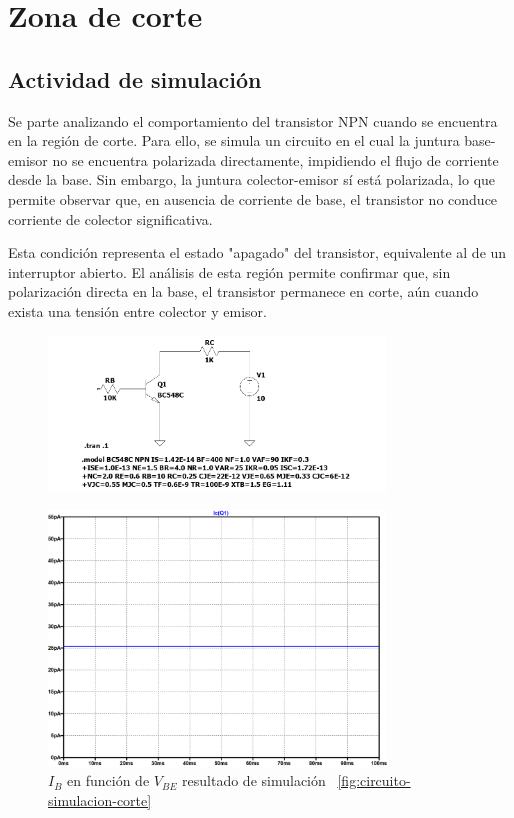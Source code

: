 \documentclass[chaptersright]{informeutn}
\begin{document}
\section{Zona de corte}
  \subsection{Actividad de simulación}
    Se parte analizando el comportamiento del transistor NPN cuando 
    se encuentra en la región de corte. Para ello, se simula un 
    circuito en el cual la juntura base-emisor no se encuentra 
    polarizada directamente, impidiendo el flujo de corriente desde 
    la base. Sin embargo, la juntura colector-emisor sí está 
    polarizada, lo que permite observar que, en ausencia de 
    corriente de base, el transistor no conduce corriente de 
    colector significativa.

    Esta condición representa el estado "apagado" del transistor, 
    equivalente al de un interruptor abierto. El análisis de esta 
    región permite confirmar que, sin polarización directa en la 
    base, el transistor permanece en corte, aún cuando exista una 
    tensión entre colector y emisor.
    \begin{figure}[H]
        \centering
        \includegraphics[width=0.8\textwidth, keepaspectratio]{pictures/circuito-simulacion-corte.png}
        \caption{}
    \end{figure}
    \begin{figure}[H]
        \centering
        \includegraphics[width=0.8\textwidth, keepaspectratio]{pictures/curva-simulacion-corte.png}
        \caption{$I_B$ en función de $V_{BE}$ resultado de simulación
        ~\ref{fig:circuito-simulacion-corte}}
    \end{figure}
\end{document}
